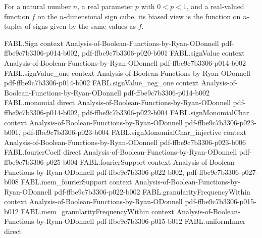 \begin{definition}
\label{FABL.biasedView}
\leanok
{}
For a natural number $n$, a real parameter $p$ with $0<p<1$, and a real-valued function
$f$ on the $n$-dimensional sign cube, its biased view is the function on $n$-tuples of
signs given by the same values as $f$.
\end{definition}

\begin{theorem}
\label{FABL.biasedView_apply}
\leanok
{}
\proofstep
  {FABL.Sign}
  {context}
  {Analysis-of-Boolean-Functions-by-Ryan-ODonnell}
  {pdf-ffbe9c7b3306-p014-b002,
    pdf-ffbe9c7b3306-p020-b001}
\proofstep
  {FABL.signValue}
  {context}
  {Analysis-of-Boolean-Functions-by-Ryan-ODonnell}
  {pdf-ffbe9c7b3306-p014-b002}
\proofstep
  {FABL.signValue_one}
  {context}
  {Analysis-of-Boolean-Functions-by-Ryan-ODonnell}
  {pdf-ffbe9c7b3306-p014-b002}
\proofstep
  {FABL.signValue_neg_one}
  {context}
  {Analysis-of-Boolean-Functions-by-Ryan-ODonnell}
  {pdf-ffbe9c7b3306-p014-b002}
\proofstep
  {FABL.monomial}
  {direct}
  {Analysis-of-Boolean-Functions-by-Ryan-ODonnell}
  {pdf-ffbe9c7b3306-p014-b002,
    pdf-ffbe9c7b3306-p022-b004}
\proofstep
  {FABL.signMonomialChar}
  {context}
  {Analysis-of-Boolean-Functions-by-Ryan-ODonnell}
  {pdf-ffbe9c7b3306-p023-b001,
    pdf-ffbe9c7b3306-p023-b004}
\proofstep
  {FABL.signMonomialChar_injective}
  {context}
  {Analysis-of-Boolean-Functions-by-Ryan-ODonnell}
  {pdf-ffbe9c7b3306-p023-b006}
\proofstep
  {FABL.fourierCoeff}
  {direct}
  {Analysis-of-Boolean-Functions-by-Ryan-ODonnell}
  {pdf-ffbe9c7b3306-p025-b004}
\proofstep
  {FABL.fourierSupport}
  {context}
  {Analysis-of-Boolean-Functions-by-Ryan-ODonnell}
  {pdf-ffbe9c7b3306-p022-b002,
    pdf-ffbe9c7b3306-p027-b008}
\proofstep
  {FABL.mem_fourierSupport}
  {context}
  {Analysis-of-Boolean-Functions-by-Ryan-ODonnell}
  {pdf-ffbe9c7b3306-p022-b002}
\proofstep
  {FABL.granularityFrequencyWithin}
  {context}
  {Analysis-of-Boolean-Functions-by-Ryan-ODonnell}
  {pdf-ffbe9c7b3306-p015-b012}
\proofstep
  {FABL.mem_granularityFrequencyWithin}
  {context}
  {Analysis-of-Boolean-Functions-by-Ryan-ODonnell}
  {pdf-ffbe9c7b3306-p015-b012}
\proofstep
  {FABL.uniformInner}
  {direct}

\end{theorem}
